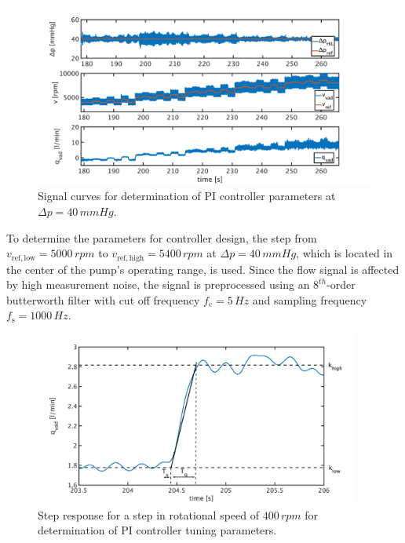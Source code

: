 \begin{figure}[ht]
  \centering
  \includegraphics[width=\textwidth]{images/chapt_5/dyn_meas_40.pdf}
  \caption[Signal curves for determination of PI controller parameters at $\Delta{p}=40\,mmHg$]{Signal curves for determination of PI controller parameters at $\Delta{p}=40\,mmHg$.}
  \label{fig:dyn_meas_40}
\end{figure}
To determine the parameters for controller design, the step from $v_{\mathrm{ref,low}}=5000\, rpm$ to $v_{\mathrm{ref,high}}=5400\, rpm$ at $\Delta{p}=40\,mmHg$, which is located in the center of the pump's operating range, is used.
Since the flow signal is affected by high measurement noise, the signal is preprocessed using an $8^{th}$-order butterworth filter with cut off frequency $f_{\mathrm{c}}=5\,Hz$ and sampling frequency $f_{\mathrm{s}}=1000\,Hz$.
\begin{figure}[ht]
  \centering
  \includegraphics[width=0.95\textwidth]{images/chapt_5/param_calc_PI.pdf}
  \caption[Step response for determination of PI controller tuning parameters]{Step response for a step in rotational speed of $400\,rpm$ for determination of PI controller tuning parameters.}
  \label{fig:param_calc_PI}
\end{figure}
